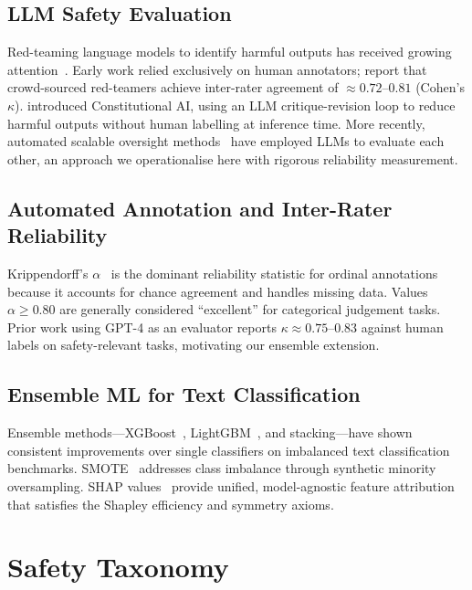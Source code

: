 \documentclass[10pt,letterpaper]{article}
\begin{document}
\subsection{LLM Safety Evaluation}

Red-teaming language models to identify harmful outputs has received growing
attention~\citep{ganguli2022redteam,perez2022redteam}.  Early work relied
exclusively on human annotators; \citet{ganguli2022redteam} report that
crowd-sourced red-teamers achieve inter-rater agreement of ${\approx}0.72$--$0.81$
(Cohen's $\kappa$).  \citet{bai2022constitutional} introduced Constitutional AI,
using an LLM critique-revision loop to reduce harmful outputs without human
labelling at inference time.  More recently, automated scalable oversight
methods~\citep{openai2024gpt4} have employed LLMs to evaluate each other,
an approach we operationalise here with rigorous reliability measurement.

\subsection{Automated Annotation and Inter-Rater Reliability}

Krippendorff's $\alpha$~\citep{krippendorff2018content} is the dominant
reliability statistic for ordinal annotations because it accounts for
chance agreement and handles missing data.  Values $\alpha \geq 0.80$ are
generally considered ``excellent'' for categorical judgement tasks.  Prior
work using GPT-4 as an evaluator reports $\kappa \approx 0.75$--$0.83$ against
human labels on safety-relevant tasks, motivating our ensemble extension.

\subsection{Ensemble ML for Text Classification}

Ensemble methods---XGBoost~\citep{chen2016xgboost},
LightGBM~\citep{ke2017lightgbm}, and stacking---have shown consistent
improvements over single classifiers on imbalanced text classification
benchmarks.  SMOTE~\citep{chawla2002smote} addresses class imbalance through
synthetic minority oversampling.  SHAP values~\citep{lundberg2017shap} provide
unified, model-agnostic feature attribution that satisfies the Shapley
efficiency and symmetry axioms.

\section{Safety Taxonomy}
\label{sec:taxonomy}
\end{document}
